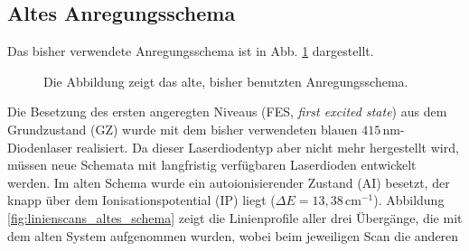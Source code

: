 \subsection{Altes Anregungsschema}\label{subsec:anregungsschema_alt}
Das bisher verwendete Anregungsschema ist in Abb.
\ref{fig:anregungsschema_alt} dargestellt.
\begin{figure}[h]
 	\centering
	\caption[Anregungsschema, alt]{Die Abbildung zeigt das alte, bisher benutzten
	Anregungsschema.}\label{fig:anregungsschema_alt}
\end{figure}
Die Besetzung des ersten angeregten
Niveaus (FES, \textit{first excited state}) aus dem Grundzustand (GZ) wurde mit
dem bisher verwendeten blauen $415\,$nm-Diodenlaser realisiert. Da dieser Laserdiodentyp aber nicht mehr
hergestellt wird, müssen neue Schemata mit langfristig verfügbaren Laserdioden entwickelt
werden.
Im alten Schema wurde ein autoionisierender Zustand (AI) besetzt, der knapp
über dem Ionisationspotential (IP) liegt ($\Delta E=13,38\,$cm$^{-1}$).
Abbildung \ref{fig:linienscans_altes_schema} zeigt die Linienprofile aller drei
Übergänge, die mit dem alten System aufgenommen wurden, wobei beim jeweiligen Scan die anderen
